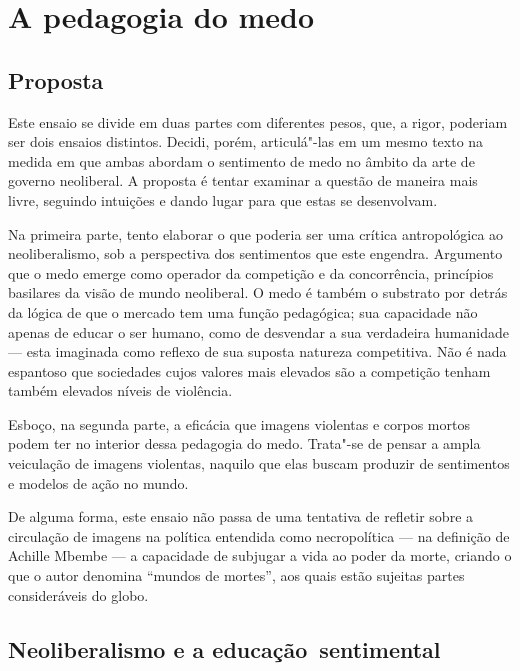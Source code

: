 \chapter{A pedagogia do medo}

\section*{Proposta}

Este ensaio se divide em duas partes com diferentes pesos, que, a rigor, poderiam ser dois ensaios distintos. Decidi, porém,
articulá"-las em um mesmo texto na medida em que ambas abordam o
sentimento de medo no âmbito da arte de governo neoliberal. A proposta é
tentar examinar a questão de maneira mais livre, seguindo intuições e dando lugar
para que estas se desenvolvam.

Na primeira parte, tento elaborar o que poderia ser uma crítica
antropológica ao neoliberalismo, sob a perspectiva dos sentimentos que
este engendra. Argumento que o medo emerge como operador da competição e
da concorrência, princípios basilares da visão de mundo neoliberal. O
medo é também o substrato por detrás da lógica de que o mercado tem uma
função pedagógica; sua capacidade não apenas de educar o ser humano,
como de desvendar a sua verdadeira humanidade --- esta imaginada como reflexo de
sua suposta natureza competitiva. Não é nada espantoso que sociedades
cujos valores mais elevados são a competição tenham também elevados
níveis de violência.

Esboço, na segunda parte, a eficácia que imagens violentas e corpos
mortos podem ter no interior dessa pedagogia do medo. Trata"-se de pensar
a ampla veiculação de imagens violentas, naquilo que elas buscam
produzir de sentimentos e modelos de ação no mundo.

De alguma forma, este ensaio não
passa de uma tentativa de refletir sobre a circulação de imagens na política
entendida como necropolítica --- na definição de Achille Mbembe --- a capacidade de subjugar a vida ao poder da morte, criando o
que o autor denomina ``mundos de mortes'', aos quais estão sujeitas partes
consideráveis do globo.

\pagebreak

\section*{Neoliberalismo e a educação~sentimental}

